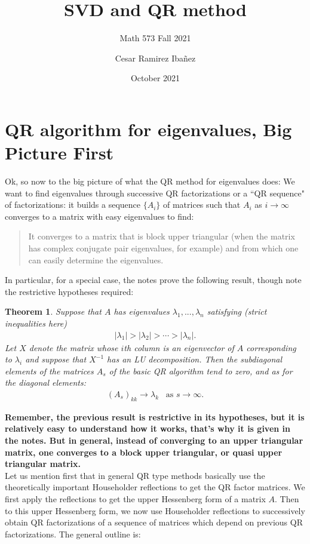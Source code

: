 \documentclass[11.5pt]{article}
\title{SVD and QR method}
\subtitle{Math 573 Fall 2021}
\author{Cesar Ramirez Iba\~{n}ez  }
\date{October 2021}
\newtheorem{theorem}{Theorem}
\theoremstyle{definition}
\begin{document}
\maketitle
  


\section{QR algorithm for eigenvalues, Big Picture First}
Ok, so now to the big picture of what the QR method for eigenvalues does: We want to find eigenvalues through successive QR factorizations or a ``QR sequence" of factorizations: it builds a sequence $\{A_i\}$ of matrices such that $A_i$ as $i\rightarrow \infty$ converges to a matrix with easy eigenvalues to find:
\begin{quote}
It converges to a matrix that is block upper triangular (when the matrix has complex conjugate pair eigenvalues, for example) and from which one can easily determine the eigenvalues. 
\end{quote}
In particular, for a special case, the notes prove the following result, though note the restrictive hypotheses required:
\begin{theorem}
Suppose that $A$ has eigenvalues $\lambda_1,...,\lambda_n$ satisfying (strict inequalities here)
\begin{align*}
|\lambda_1|>|\lambda_2|> \cdots > |\lambda_n|.
\end{align*}
Let $X$ denote the matrix whose $i$th column is an eigenvector of $A$ corresponding to $\lambda_i$ and suppose that $X^{-1}$ has an LU decomposition. Then the subdiagonal elements of the matrices $A_s$ of the basic QR algorithm tend to zero, and as for the diagonal elements:
\begin{align*}
(A_s)_{kk}\rightarrow \lambda_k\;\;\;\text{as } s\rightarrow \infty.
\end{align*}
\end{theorem}

\textbf{Remember, the previous result is restrictive in its hypotheses, but it is relatively easy to understand how it works, that's why it is given in the notes. But in general, instead of converging to an upper triangular matrix, one converges to a block upper triangular, or quasi upper triangular matrix.} \\

Let us mention first that in general QR type methods basically use the theoretically important Householder reflections to get the QR factor matrices. We first apply the reflections to get the upper Hessenberg form of a matrix $A$. Then to this upper Hessenberg form, we now use Householder reflections to successively obtain QR factorizations of a sequence of matrices which depend on previous QR factorizations. The general outline is: 
\end{document}
